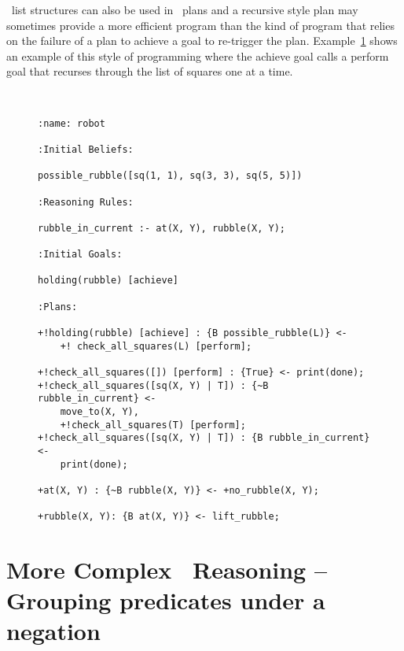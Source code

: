 \prolog\ list structures can also be used in
\gwendolen\ plans and a recursive style
plan may sometimes provide a more efficient program than the kind of
program that relies on the failure of a plan to achieve a
goal to re-trigger the plan.
Example~\ref{code:pickuprubble_list2}
shows an example of this style of programming where the achieve
goal calls a perform
goal that recurses through the
list of squares one at a time. 
\begin{figure}[htb]
\begin{ourexample}
\label{code:pickuprubble_list2} \quad \\
\begin{lstlisting}[basicstyle=\sffamily,style=easslisting,language=Gwendolen]
:name: robot

:Initial Beliefs:

possible_rubble([sq(1, 1), sq(3, 3), sq(5, 5)])

:Reasoning Rules:

rubble_in_current :- at(X, Y), rubble(X, Y);

:Initial Goals:

holding(rubble) [achieve]

:Plans:

+!holding(rubble) [achieve] : {B possible_rubble(L)} <- 
    +! check_all_squares(L) [perform];

+!check_all_squares([]) [perform] : {True} <- print(done);
+!check_all_squares([sq(X, Y) | T]) : {~B rubble_in_current} <- 
    move_to(X, Y), 
    +!check_all_squares(T) [perform];
+!check_all_squares([sq(X, Y) | T]) : {B rubble_in_current} <- 
    print(done);

+at(X, Y) : {~B rubble(X, Y)} <- +no_rubble(X, Y);

+rubble(X, Y): {B at(X, Y)} <- lift_rubble;
\end{lstlisting}
\end{ourexample}
\end{figure}

\section{More Complex \prolog\ Reasoning -- Grouping predicates under a negation}


